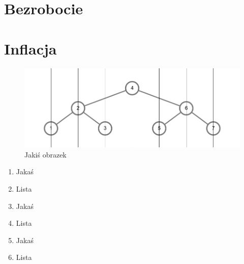 \documentclass[12pt]{extarticle}
\begin{document}
\section{Bezrobocie}
\section{Inflacja}


\begin{figure}[H]
\centering
\includegraphics[width=15cm]{sample}
\caption{Jakiś obrazek}
\end{figure}


\begin{enumerate}
	\item Jakaś
	\item Lista
	\item Jakaś
	\item Lista
	\item Jakaś
	\item Lista
\end{enumerate}

\clearpage\mbox{}\clearpage
\end{document}
